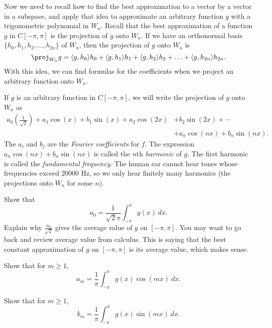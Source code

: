 Now we need to recall how to find the best approximation to a vector by a vector in a subspace, and apply that idea to approximate an arbitrary function $g$ with a trigonometric polynomial in $W_n$. Recall that the best approximation of a function $g$ in $C[-\pi,\pi]$ is the projection of $g$ onto $W_n$. If we have an orthonormal basis $\{h_0, h_1, h_2, \ldots, h_{2n}\}$ of $W_n$, then the projection of $g$ onto $W_n$ is
\[\proj_{W_n} g = \langle g,h_0 \rangle h_0 + \langle g,h_1 \rangle h_1 + \langle g,h_2 \rangle h_2 + \ldots + \langle g,h_{2n} \rangle h_{2n}.\]
With this idea, we can find formulas for the coefficients when we project an arbitrary function onto $W_n$.


\begin{pactivity} \label{act:Fourier_projection} If $g$ is an arbitrary function in $C[-\pi,\pi]$, we will write the projection of $g$ onto $W_n$ as
\begin{align*}
a_0\left(\frac{1}{\sqrt{2}}\right) + a_1 \cos(x) + b_1\sin(x) + a_2 \cos(2x) &+ b_2 \sin(2x) + \cdots \\
	&+ a_n \cos(nx) + b_n \sin(nx).
\end{align*}
The $a_i$ and $b_j$ are the \emph{Fourier coefficients} for $f$. The expression $a_n\cos(nx)+b_n\sin(nx)$ is called the $n$th \emph{harmonic} of $g$. The first harmonic is called the \emph{fundamental frequency}. The human ear cannot hear tones whose frequencies exceed 20000 Hz, so we only hear finitely many harmonics (the projections onto $W_n$ for some $n$).
	\ba
	\item Show that
\begin{equation}
a_0 =  \frac{1}{\sqrt{2}\pi}\int_{-\pi}^{\pi} g(x) \ dx. \label{eq:a0}
\end{equation}
Explain why $\frac{a_0}{\sqrt{2}}$ gives the average value of $g$ on $[-\pi,\pi]$. You may want to go back and review average value from calculus. This is saying that the best constant approximation of $g$ on $[-\pi,\pi]$ is its average value, which makes sense.

	
	\item Show that for $m \geq 1$,
\begin{equation}
a_m =  \frac{1}{\pi}\int_{-\pi}^{\pi} g(x) \cos(mx) \ dx. \label{eq:am}
\end{equation}


	\item Show that for $m \geq 1$,
\begin{equation}
b_m =  \frac{1}{\pi}\int_{-\pi}^{\pi} g(x) \sin(mx) \ dx. \label{eq:bm}
\end{equation}


	\ea
\end{pactivity}


